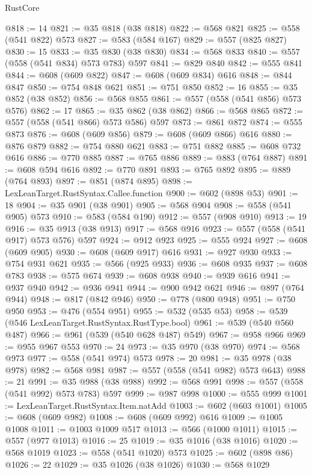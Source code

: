 \begin{lexlean}{RustCore}
\begin{coremodule}
@818 := 14
@821 := @35 @818 (@38 @818)
@822 := @568 @821
@825 := @558 (@541 @822) @573
@827 := @583 (@584 @167)
@829 := @557 (@825 @827)
@830 := 15
@833 := @35 @830 (@38 @830)
@834 := @568 @833
@840 := @557 (@558 (@541 @834) @573 @783) @597
@841 := @829 @840
@842 := @555 @841
@844 := @608 (@609 @822)
@847 := @608 (@609 @834) @616
@848 := @844 @847
@850 := @754 @848 @621
@851 := @751 @850
@852 := 16
@855 := @35 @852 (@38 @852)
@856 := @568 @855
@861 := @557 (@558 (@541 @856) @573 @576)
@862 := 17
@865 := @35 @862 (@38 @862)
@866 := @568 @865
@872 := @557 (@558 (@541 @866) @573 @586) @597
@873 := @861 @872
@874 := @555 @873
@876 := @608 (@609 @856)
@879 := @608 (@609 @866) @616
@880 := @876 @879
@882 := @754 @880 @621
@883 := @751 @882
@885 := @608 @732 @616
@886 := @770 @885
@887 := @765 @886
@889 := @883 (@764 @887)
@891 := @608 @594 @616
@892 := @770 @891
@893 := @765 @892
@895 := @889 (@764 @893)
@897 := @851 (@874 @895)
@898 := LexLeanTarget.RustSyntax.Callee.function
@900 := @602 (@898 @53)
@901 := 18
@904 := @35 @901 (@38 @901)
@905 := @568 @904
@908 := @558 (@541 @905) @573
@910 := @583 (@584 @190)
@912 := @557 (@908 @910)
@913 := 19
@916 := @35 @913 (@38 @913)
@917 := @568 @916
@923 := @557 (@558 (@541 @917) @573 @576) @597
@924 := @912 @923
@925 := @555 @924
@927 := @608 (@609 @905)
@930 := @608 (@609 @917) @616
@931 := @927 @930
@933 := @754 @931 @621
@935 := @566 (@925 @933)
@936 := @608 @935
@937 := @608 @783
@938 := @575 @674
@939 := @608 @938
@940 := @939 @616
@941 := @937 @940
@942 := @936 @941
@944 := @900 @942 @621
@946 := @897 (@764 @944)
@948 := @817 (@842 @946)
@950 := @778 (@800 @948)
@951 := @750 @950
@953 := @476 (@554 @951)
@955 := @532 (@535 @53)
@958 := @539 (@546 LexLeanTarget.RustSyntax.RustType.bool)
@961 := @539 (@540 @560 @487)
@966 := @961 (@539 (@540 @628 @487) @549)
@967 := @958 @966
@969 := @955 @967 @553
@970 := 24
@973 := @35 @970 (@38 @970)
@974 := @568 @973
@977 := @558 (@541 @974) @573
@978 := 20
@981 := @35 @978 (@38 @978)
@982 := @568 @981
@987 := @557 (@558 (@541 @982) @573 @643)
@988 := 21
@991 := @35 @988 (@38 @988)
@992 := @568 @991
@998 := @557 (@558 (@541 @992) @573 @783) @597
@999 := @987 @998
@1000 := @555 @999
@1001 := LexLeanTarget.RustSyntax.Item.natAdd
@1003 := @602 (@603 @1001)
@1005 := @608 (@609 @982)
@1008 := @608 (@609 @992) @616
@1009 := @1005 @1008
@1011 := @1003 @1009 @517
@1013 := @566 (@1000 @1011)
@1015 := @557 (@977 @1013)
@1016 := 25
@1019 := @35 @1016 (@38 @1016)
@1020 := @568 @1019
@1023 := @558 (@541 @1020) @573
@1025 := @602 (@898 @86)
@1026 := 22
@1029 := @35 @1026 (@38 @1026)
@1030 := @568 @1029

\end{coremodule}
\end{lexlean}

